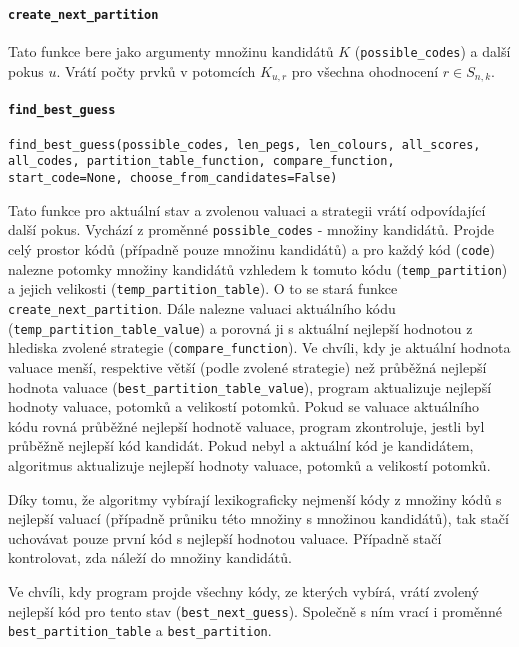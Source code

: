 \documentclass[12pt,a4paper]{article}
\begin{document}
\paragraph{\texttt{create\_next\_partition}}
Tato funkce bere jako argumenty množinu kandidátů $K$ (\texttt{possible\_codes}) a další pokus $u$. Vrátí počty prvků v potomcích $K_{u,r}$ pro všechna ohodnocení $r \in S_{n,k}$.

\paragraph{\texttt{find\_best\_guess}}
\texttt{find\_best\_guess(possible\_codes, len\_pegs, len\_colours, all\_scores, all\_codes, partition\_table\_function, compare\_function, start\_code=None, choose\_from\_candidates=False)}

Tato funkce pro aktuální stav a zvolenou valuaci a strategii vrátí odpovídající další pokus. Vychází z proměnné \texttt{possible\_codes} - množiny kandidátů. Projde celý prostor kódů (případně pouze množinu kandidátů) a pro každý kód (\texttt{code}) nalezne potomky množiny kandidátů vzhledem k tomuto kódu (\texttt{temp\_partition}) a jejich velikosti (\texttt{temp\_partition\_table}). O to se stará funkce \texttt{create\_next\_partition}. Dále nalezne valuaci aktuálního kódu (\texttt{temp\_partition\_table\_value}) a porovná ji s aktuální nejlepší hodnotou z hlediska zvolené strategie (\texttt{compare\_function}). Ve chvíli, kdy je aktuální hodnota valuace menší, respektive větší (podle zvolené strategie) než průběžná nejlepší hodnota valuace (\texttt{best\_partition\_table\_value}), program aktualizuje nejlepší hodnoty valuace, potomků a velikostí potomků. Pokud se valuace aktuálního kódu rovná průběžné nejlepší hodnotě valuace, program zkontroluje, jestli byl průběžně nejlepší kód kandidát. Pokud nebyl a aktuální kód je kandidátem, algoritmus aktualizuje nejlepší hodnoty valuace, potomků a velikostí potomků. 

Díky tomu, že algoritmy vybírají lexikograficky nejmenší kódy z množiny kódů s nejlepší valuací (případně průniku této množiny s množinou kandidátů), tak stačí uchovávat pouze první kód s nejlepší hodnotou valuace. Případně stačí kontrolovat, zda náleží do množiny kandidátů.

Ve chvíli, kdy program projde všechny kódy, ze kterých vybírá, vrátí zvolený nejlepší kód pro tento stav (\texttt{best\_next\_guess}). Společně s ním vrací i proměnné \texttt{best\_partition\_table} a \texttt{best\_partition}. 
\end{document}
